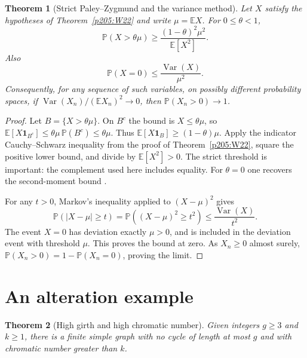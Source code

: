 \documentclass[11pt,oneside,openany]{book}
\theoremstyle{plain}
\newtheorem{theorem}{Theorem}[chapter]
\theoremstyle{definition}
\theoremstyle{remark}
\begin{document}
\begin{theorem}[Strict Paley--Zygmund and the variance method]
\label{p205:W23}
Let \(X\) satisfy the hypotheses of Theorem~\ref{p205:W22} and
write \(\mu=\mathbb E X\). For \(0\le\theta<1\),
\[
 \mathbb P(X>\theta\mu)\ge
   \frac{(1-\theta)^2\mu^2}{\mathbb E[X^2]}.
\]
Also
\[
 \mathbb P(X=0)\le\frac{\operatorname{Var}(X)}{\mu^2}.
\]
Consequently, for any sequence of such variables, on possibly
different probability spaces, if
\(\operatorname{Var}(X_n)/(\mathbb E X_n)^2\to0\), then
\(\mathbb P(X_n>0)\to1\).
\end{theorem}

\begin{proof}
Let \(B=\{X>\theta\mu\}\). On \(B^c\) the bound is \(X\le\theta\mu\),
so \(\mathbb E[X\mathbf 1_{B^c}]\le\theta\mu\,\mathbb P(B^c)
\le\theta\mu\). Thus \(\mathbb E[X\mathbf 1_B]\ge(1-\theta)\mu\).
Apply the indicator Cauchy--Schwarz inequality from the proof
of Theorem~\ref{p205:W22}, square the positive lower bound, and
divide by \(\mathbb E[X^2]>0\). The strict threshold is important:
the complement used here includes equality. For \(\theta=0\)
one recovers the second-moment bound \cite{tao,alon}.

For any \(t>0\), Markov's inequality applied to
\((X-\mu)^2\) gives
\[
 \mathbb P(|X-\mu|\ge t)
  =\mathbb P((X-\mu)^2\ge t^2)
  \le \frac{\operatorname{Var}(X)}{t^2}.
\]
The event \(X=0\) has deviation exactly \(\mu>0\), and is
included in the deviation event with threshold \(\mu\). This
proves the bound at zero. As \(X_n\ge0\) almost surely,
\(\mathbb P(X_n>0)=1-\mathbb P(X_n=0)\), proving the limit.
\end{proof}

\section{An alteration example}

\begin{theorem}[High girth and high chromatic number]
\label{p205:W24}
Given integers \(g\ge3\) and \(k\ge1\), there is a finite
simple graph with no cycle of length at most \(g\) and with
chromatic number greater than \(k\).
\end{theorem}
\end{document}
